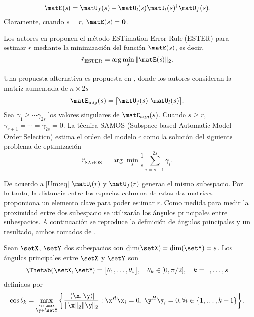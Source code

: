 \begin{equation}
	\matE(s) = \matU_f(s) - \matU_l(s)\matU_l(s)^\dagger\matU_f(s).
	\label{eq:rhatESTER}
\end{equation}
Claramente, cuando $s=r$, $\matE(s)= \mathbf{0}$.

Los autores en \cite{Badeau2006} proponen el método ESTimation Error Rule (ESTER) para estimar $r$ mediante la minimización del función $\matE(s)$, es decir,
\begin{equation}
	\hat{r}_{\mathrm{ESTER}} = \arg\min_s\|\matE(s)\|_2.
	\label{Eq:ESTER_Rule}
\end{equation}

Una propuesta alternativa es propuesta en \cite{Papy2007}, donde los autores consideran la matriz aumentada de $n\times 2s$
\[ \matE_{aug}(s) = \big[\matU_f(s)\ \matU_l(s)\big].\]
Sea $\gamma_1\ge\cdots\gamma_{2s}$ los valores singulares de $\matE_{aug}(s)$. Cuando $s\ge r$, $\gamma_{r+1} = \cdots =\gamma_{2s} = 0$. La técnica SAMOS (Subspace based Automatic Model Order Selection) estima el orden del modelo $r$ como la solución del siguiente problema de optimización
\begin{equation}
	\hat{r}_{\mathrm{SAMOS}} = \arg\min_s\frac{1}{s}\sum_{i=s+1}^{2s} \gamma_i. 
	\label{eq:rhatSAMOS}
\end{equation}

De acuerdo a \eqref{Um:eq} $\matU_l(r)$ y $\matU_f(r)$ generan el mismo subespacio. Por lo tanto, la distancia entre los espacios columna de estas dos matrices proporciona un elemento clave para poder estimar $r$. Como medida para medir la proximidad entre dos subespacio se utilizarán los ángulos principales entre subespacios. A continuación se reproduce la definición de ángulos principales y un resultado, ambos tomados de \cite{Stewart1990}.

\begin{definition}\label{def:principalAngles}
	Sean $\setX$, $\setY$ dos subespacios con $\dim(\setX) = \dim(\setY)=s$. Los ángulos principales entre $\setX$ y $\setY$ son
	\begin{equation*}
		\Thetab(\setX,\setY) = \big[\theta_1, \ldots, \theta_s\big],\quad \theta_k\in[0,\pi/2],\quad k=1,\ldots,s
	\end{equation*}
	definidos por
	\begin{equation}
		\cos\theta_k = \max_{\stackrel{\x\in\setX}{\y\in\setY}}\bigg\{\frac{|\langle\x,\y\rangle|}{\|\x\|_2\|\y\|_2} : \x^H\x_i = 0,\ \y^H\y_i = 0,  \forall i\in\{1,\ldots,k-1\}\bigg\}.
		\label{Eq:principalAngles2}
	\end{equation}
\end{definition}

